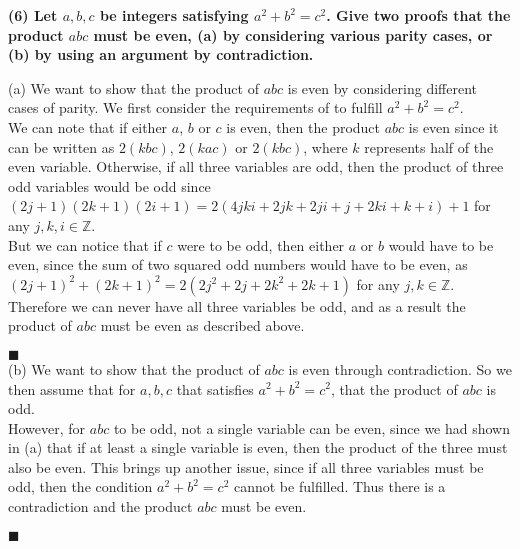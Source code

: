 \documentclass[20pt]{article}
\begin{document}
\noindent
\textbf{(6) Let $a,b,c$ be integers satisfying $a^2+b^2=c^2$.  Give two proofs that the product $abc$ must be even, (a) by considering various parity cases, or (b) by using an argument by contradiction.}\\
\begin{text}
    (a) We want to show that the product of $abc$ is even by considering different cases of parity. We first consider the requirements of to fulfill $a^2 + b^2 = c^2$.\\
    
    \noindent
    We can note that if either $a$, $b$ or $c$ is even, then the product $abc$ is even since it can be written as $2(kbc)$, $2(kac)$ or $2(kbc)$, where $k$ represents half of the even variable. Otherwise, if all three variables are odd, then the product of three odd variables would be odd since $(2j+1)(2k+1)(2i+1) = 2(4jki+2jk+2ji+j+2ki+k+i)+1$ for any $j,k,i \in \mathbb{Z}$.\\
    
    \noindent
    But we can notice that if $c$ were to be odd, then either $a$ or $b$ would have to be even, since the sum of two squared odd numbers would have to be even, as $(2j+1)^2 + (2k+1)^2 = 2(2j^2 + 2j + 2k^2 + 2k + 1)$ for any $j,k \in \mathbb{Z}$. Therefore we can never have all three variables be odd, and as a result the product of $abc$ must be even as described above.
    
    \hfill $\blacksquare$\\
    
    \noindent
    (b) We want to show that the product of $abc$ is even through contradiction. So we then assume that for $a, b, c$ that satisfies $a^2 + b^2 = c^2$, that the product of $abc$ is odd.\\
    
    \noindent
    However, for $abc$ to be odd, not a single variable can be even, since we had shown in (a) that if at least a single variable is even, then the product of the three must also be even. This brings up another issue, since if all three variables must be odd, then the condition $a^2 + b^2 = c^2$ cannot be fulfilled. Thus there is a contradiction and the product $abc$ must be even.
    
    \hfill $\blacksquare$
\end{text}\\
\end{document}
